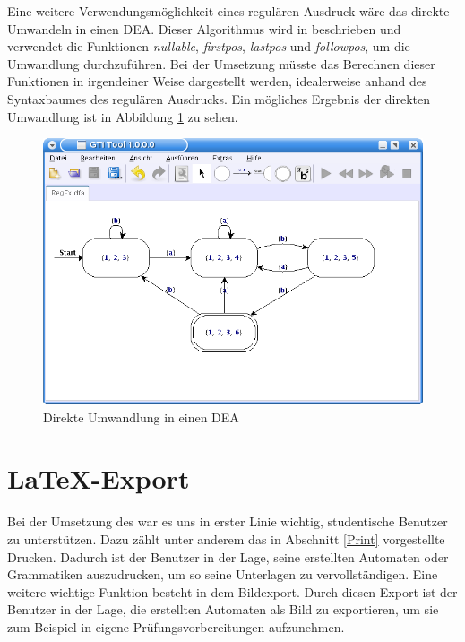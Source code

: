 Eine weitere Verwendungsmöglichkeit eines regulären Ausdruck wäre das direkte
Umwandeln in einen DEA. Dieser Algorithmus wird in
\cite[S. 175ff]{Compilers} beschrieben und verwendet die Funktionen
\textit{nullable}, \textit{firstpos}, \textit{lastpos} und \textit{followpos},
um die Umwandlung durchzuführen. Bei der Umsetzung müsste das Berechnen dieser
Funktionen in irgendeiner Weise dargestellt werden, idealerweise anhand des
Syntaxbaumes des regulären Ausdrucks. Ein mögliches Ergebnis der direkten
Umwandlung ist in Abbildung \ref{FigureRegExDFA} zu sehen.\vspace{10pt}

\begin{figure}[h!]
\begin{center}
\includegraphics[width=12cm]{../images/regex_dfa.png}
\caption{Direkte Umwandlung in einen DEA}
\label{FigureRegExDFA}
\end{center}
\end{figure}
\vspace{10pt}


\section{\LaTeX-Export}\label{PerspectiveLaTeX}

Bei der Umsetzung des \gtitools war es uns in erster Linie wichtig, studentische
Benutzer zu unterstützen. Dazu zählt unter anderem das in Abschnitt \ref{Print}
vorgestellte Drucken. Dadurch ist der Benutzer in der Lage, seine erstellten
Automaten oder Grammatiken auszudrucken, um so seine Unterlagen zu
vervollständigen. Eine weitere wichtige Funktion besteht in dem Bildexport.
Durch diesen Export ist der Benutzer in der Lage, die erstellten Automaten als
Bild zu exportieren, um sie zum Beispiel in eigene Prüfungsvorbereitungen
aufzunehmen.\vspace{10pt}

